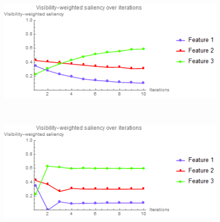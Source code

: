 \begin{figure}
	\begin{minipage}{.49\textwidth}
		\includegraphics[width=1\linewidth]{images/nucleon_naive_saliency_fixed}
		\subcaption{}
	\end{minipage}~
	\begin{minipage}{.49\textwidth}
		\includegraphics[width=1\linewidth]{images/nucleon_naive_saliency_parallelsearch}
		\subcaption{}
	\end{minipage}
	

\end{figure}

